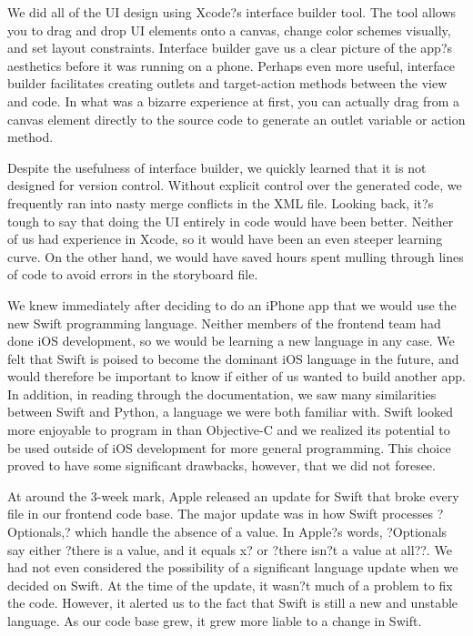 \documentclass[12pt]{article}
\begin{document}
We did all of the UI design using Xcode?s interface builder tool. The tool allows you to drag and drop UI elements onto a canvas, change color schemes visually, and set layout constraints. Interface builder gave us a clear picture of the app?s aesthetics before it was running on a phone. Perhaps even more useful, interface builder facilitates creating outlets and target-action methods between the view and code. In what was a bizarre experience at first, you can actually drag from a canvas element directly to the source code to generate an outlet variable or action method. 

\bigskip

Despite the usefulness of interface builder, we quickly learned that it is not designed for version control. Without explicit control over the generated code, we frequently ran into nasty merge conflicts in the XML file. Looking back, it?s tough to say that doing the UI entirely in code would have been better. Neither of us had experience in Xcode, so it would have been an even steeper learning curve. On the other hand, we would have saved hours spent mulling through lines of code to avoid errors in the storyboard file. 

\bigskip

We knew immediately after deciding to do an iPhone app that we would use the new Swift programming language. Neither members of the frontend team had done iOS development, so we would be learning a new language in any case. We felt that Swift is poised to become the dominant iOS language in the future, and would therefore be important to know if either of us wanted to build another app. In addition, in reading through the documentation, we saw many similarities between Swift and Python, a language we were both familiar with. Swift looked more enjoyable to program in than Objective-C and we realized its potential to be used outside of iOS development for more general programming. This choice proved to have some significant drawbacks, however, that we did not foresee. 

\bigskip

At around the 3-week mark, Apple released an update for Swift that broke every file in our frontend code base. The major update was in how Swift processes ?Optionals,? which handle the absence of a value. In Apple?s words, ?Optionals say either ?there is a value, and it equals x? or ?there isn?t a value at all??. We had not even considered the possibility of a significant language update when we decided on Swift. At the time of the update, it wasn?t much of a problem to fix the code. However, it alerted us to the fact that Swift is still a new and unstable language. As our code base grew, it grew more liable to a change in Swift.
\end{document}
